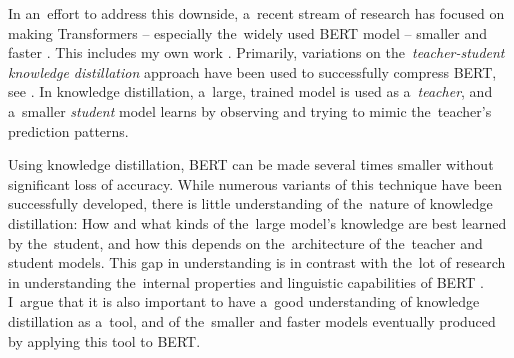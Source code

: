 \documentclass[bsc,frontabs,singlespacing,parskip,deptreport]{infthesis}
\begin{document}
{{    %
    In an~effort to address this downside, a~recent stream of research has focused on making Transformers -- especially the~widely used BERT model \citep{Devlin_2018} -- smaller and faster \citep{Michel_2019,Cheong_2019}. This includes my own work \citep{Sucik_2019}.
    Primarily, variations on the~\textit{teacher-student knowledge distillation} approach \citep{Bucila_2006} have been used to successfully compress BERT, see \citet{Sun_2019a,Mukherjee_2019,Tang_2019a,Tang_2019b,Jiao_2019,Sanh_2019}.
    In knowledge distillation, a~large, trained model is used as a~\textit{teacher}, and a~smaller \textit{student} model learns by observing and trying to mimic the~teacher's prediction patterns.
    
    
    Using knowledge distillation, BERT can be made several times smaller without significant loss of accuracy.
    While numerous variants of this technique have been successfully developed, there is little understanding of the~nature of knowledge distillation: 
    How and what kinds of the~large model's knowledge are best learned by the~student, and how this depends on the~architecture of the~teacher and student models.
    This gap in understanding is in contrast with the~lot of research in understanding the~internal properties and linguistic capabilities of BERT \citep{Ganesh_2019,Tenney_2019b,Kovaleva_2019,Lin_2019,Rogers_2020}.
    I~argue that it is also important to have a~good understanding of knowledge distillation as a~tool, and of the~smaller and faster models eventually produced by applying this tool to BERT.
        
  }
  
}
\end{document}
